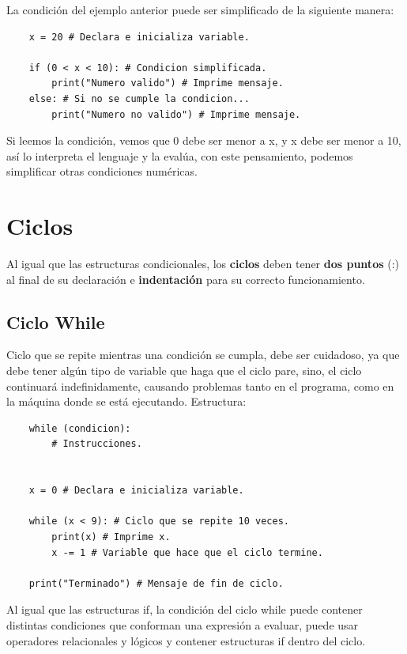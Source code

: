 La condición del ejemplo anterior puede ser simplificado de la siguiente manera:
\begin{lstlisting}
	x = 20 # Declara e inicializa variable.
	
	if (0 < x < 10): # Condicion simplificada.
		print("Numero valido") # Imprime mensaje.
	else: # Si no se cumple la condicion...
		print("Numero no valido") # Imprime mensaje.
\end{lstlisting}

Si leemos la condición, vemos que 0 debe ser menor a x, y x debe ser menor a 10, así lo interpreta el lenguaje y la evalúa, con este pensamiento, podemos simplificar otras condiciones numéricas.



\section{Ciclos}
\hspace{0.55cm}Al igual que las estructuras condicionales, los \textbf{ciclos} deben tener \textbf{dos puntos} (:) al final de su declaración e \textbf{indentación} para su correcto funcionamiento.


\subsection{Ciclo While}
\hspace{0.55cm}Ciclo que se repite mientras una condición se cumpla, debe ser cuidadoso, ya que debe tener algún tipo de variable que haga que el ciclo pare, sino, el ciclo continuará indefinidamente, causando problemas tanto en el programa, como en la máquina donde se está ejecutando. Estructura:
\begin{lstlisting}
	while (condicion):
		# Instrucciones.
	
	
	x = 0 # Declara e inicializa variable.
	
	while (x < 9): # Ciclo que se repite 10 veces.
		print(x) # Imprime x.
		x -= 1 # Variable que hace que el ciclo termine.
		
	print("Terminado") # Mensaje de fin de ciclo.
\end{lstlisting}

Al igual que las estructuras if, la condición del ciclo while puede contener distintas condiciones que conforman una expresión a evaluar, puede usar operadores relacionales y lógicos y contener estructuras if dentro del ciclo.



